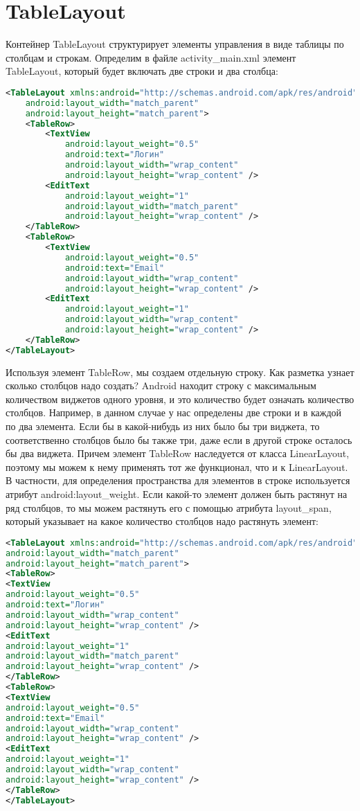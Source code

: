 \section{TableLayout}

Контейнер TableLayout структурирует элементы управления в виде таблицы
по столбцам и строкам.
Определим в файле activity\_main.xml элемент
TableLayout, который будет включать две строки и два столбца:
\begin{lstlisting}[language=xml, caption=\leftline{xml}, label=lst:TableLayout]
<TableLayout xmlns:android="http://schemas.android.com/apk/res/android"
    android:layout_width="match_parent"
    android:layout_height="match_parent">
    <TableRow>
        <TextView
            android:layout_weight="0.5"
            android:text="Логин"
            android:layout_width="wrap_content"
            android:layout_height="wrap_content" />
        <EditText
            android:layout_weight="1"
            android:layout_width="match_parent"
            android:layout_height="wrap_content" />
    </TableRow>
    <TableRow>
        <TextView
            android:layout_weight="0.5"
            android:text="Email"
            android:layout_width="wrap_content"
            android:layout_height="wrap_content" />
        <EditText
            android:layout_weight="1"
            android:layout_width="wrap_content"
            android:layout_height="wrap_content" />
    </TableRow>
</TableLayout>
\end{lstlisting}
Используя элемент TableRow, мы создаем отдельную строку. Как разметка
узнает сколько столбцов надо создать? Android находит строку с
максимальным количеством виджетов одного уровня, и это количество будет
означать количество столбцов. Например, в данном случае у нас определены
две строки и в каждой по два элемента. Если бы в какой-нибудь из них было
бы три виджета, то соответственно столбцов было бы также три, даже если в
другой строке осталось бы два виджета.
Причем элемент TableRow наследуется от класса LinearLayout, поэтому мы
можем к нему применять тот же функционал, что и к LinearLayout. В
частности, для определения пространства для элементов в строке
используется атрибут android:layout\_weight.
Если какой-то элемент должен быть растянут на ряд столбцов, то мы можем
растянуть его с помощью атрибута layout\_span, который указывает на какое
количество столбцов надо растянуть элемент:
\begin{lstlisting}[language=xml, caption=\leftline{xml}, label=lst:TableRow]
<TableLayout xmlns:android="http://schemas.android.com/apk/res/android"
android:layout_width="match_parent"
android:layout_height="match_parent">
<TableRow>
<TextView
android:layout_weight="0.5"
android:text="Логин"
android:layout_width="wrap_content"
android:layout_height="wrap_content" />
<EditText
android:layout_weight="1"
android:layout_width="match_parent"
android:layout_height="wrap_content" />
</TableRow>
<TableRow>
<TextView
android:layout_weight="0.5"
android:text="Email"
android:layout_width="wrap_content"
android:layout_height="wrap_content" />
<EditText
android:layout_weight="1"
android:layout_width="wrap_content"
android:layout_height="wrap_content" />
</TableRow>
</TableLayout>
\end{lstlisting}
